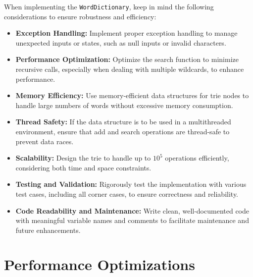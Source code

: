When implementing the \texttt{WordDictionary}, keep in mind the following considerations to ensure robustness and efficiency:

\begin{itemize}
    \item \textbf{Exception Handling:}  
    Implement proper exception handling to manage unexpected inputs or states, such as null inputs or invalid characters.
    
    \item \textbf{Performance Optimization:}  
    Optimize the search function to minimize recursive calls, especially when dealing with multiple wildcards, to enhance performance.
    
    \item \textbf{Memory Efficiency:}  
    Use memory-efficient data structures for trie nodes to handle large numbers of words without excessive memory consumption.
    
    \item \textbf{Thread Safety:}  
    If the data structure is to be used in a multithreaded environment, ensure that add and search operations are thread-safe to prevent data races.
    
    \item \textbf{Scalability:}  
    Design the trie to handle up to \(10^5\) operations efficiently, considering both time and space constraints.
    
    \item \textbf{Testing and Validation:}  
    Rigorously test the implementation with various test cases, including all corner cases, to ensure correctness and reliability.
    
    \item \textbf{Code Readability and Maintenance:}  
    Write clean, well-documented code with meaningful variable names and comments to facilitate maintenance and future enhancements.
\end{itemize}

\section*{Performance Optimizations}

